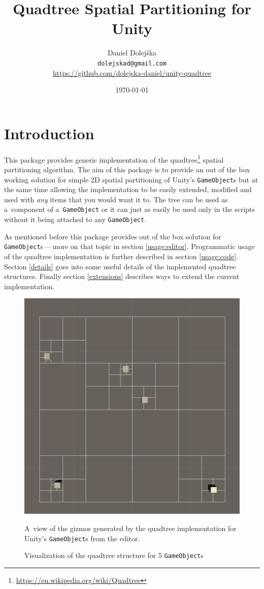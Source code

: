 \documentclass{article}
\title{Quadtree Spatial Partitioning for Unity}
\author{Daniel Dolejška\\\small\texttt{dolejskad@gmail.com}\\\small\url{https://github.com/dolejska-daniel/unity-quadtree}}
\date{\today}
\begin{document}
\maketitle

\tableofcontents

\newpage

\section{Introduction}
This package provides generic implementation of the quadtree\footnote{\url{https://en.wikipedia.org/wiki/Quadtree}} spatial partitioning algorithm.
The aim of this package is to provide an out of the box working solution for simple 2D spatial partitioning of Unity's \texttt{GameObject}s but at the same time allowing the implementation to be easily extended, modified and used with \textit{any} items that you would want it to.
The tree can be used as a~component of a~\texttt{GameObject} or it can just as easily be used only in the scripts without it being attached to any \texttt{GameObject}.

As mentioned before this package provides out of the box solution for \texttt{GameObject}s\,---\,more on that topic in section \ref{usage:editor}.
Programmatic usage of the quadtree implementation is further described in section \ref{usage:code}.
Section \ref{details} goes into some useful details of the implemented quadtree structures.
Finally section \ref{extensions} describes ways to extend the current implementation.

\begin{figure}[H]
    \centering
    \includegraphics[width=.75\textwidth]{iso_top.png}
    \caption{Visualization of the quadtree structure for 5 \texttt{GameObject}s}
    \label{fig:demo:overview}
    \medskip\small
    A~view of the gizmos generated by the quadtree implementation for Unity's \texttt{GameObject}s from the editor.
\end{figure}
\end{document}
